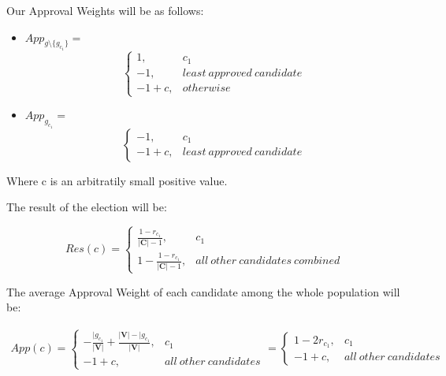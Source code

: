 \documentclass{article}
\begin{document}
Our Approval Weights will be as follows:\\
\begin{itemize}
    \item $App_{g \setminus \{g_{c_1}\}} = $
    \begin{equation}
    \begin{cases}
    1, & c_1\\
    -1, & least\ approved\ candidate\\
    -1 + c, & otherwise
    \end{cases}
    \end{equation}
    \item $App_{g_{c_1}} = $
    \begin{equation}
    \begin{cases}
    -1, & c_1\\
    -1 + c, & least\ approved\ candidate
    \end{cases}
    \end{equation}
\end{itemize}

Where c is an arbitratily small positive value. 

The result of the election will be:

\begin{equation}
{Res}(c) = 
\begin{cases}
    \frac{1-r_{c_1}}{|\boldsymbol{C}|-1}, & c_1\\
    1 - \frac{1-r_{c_1}}{|\boldsymbol{C}|-1}, & all\ other\ candidates\ combined
    \end{cases}
\end{equation}

The average Approval Weight of each candidate among the whole population will be:

\begin{equation}
\begin{aligned}
{App}(c) = 
\begin{cases}
    -\frac{|g_{c_1}}{|\boldsymbol{V}|} + \frac{|\boldsymbol{V}|-|g_{c_1}}{|\boldsymbol{V}|}, & c_1\\
    -1 + c, & all\ other\ candidates
\end{cases}
=
\begin{cases}
    1-2r_{c_1}, & c_1\\
    -1 + c, & all\ other\ candidates
\end{cases}
\end{aligned}
\end{equation}
\end{document}
